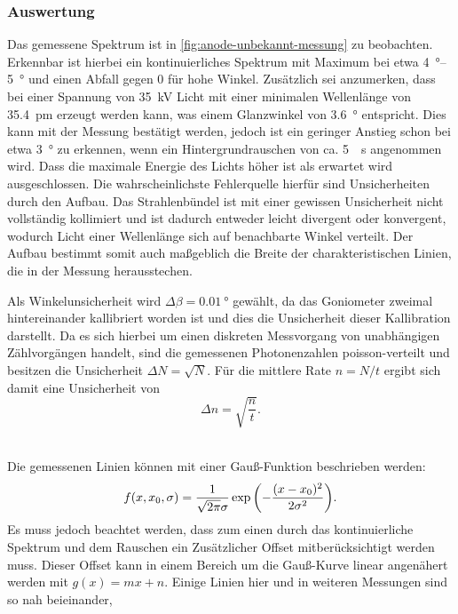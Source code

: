 \subsubsection{Auswertung}
Das gemessene Spektrum ist in \cref{fig:anode-unbekannt-messung} zu beobachten. Erkennbar ist hierbei
ein kontinuierliches Spektrum mit Maximum bei etwa \qtyrange{4}{5}{\degree} und einen Abfall gegen 0
für hohe Winkel. Zusätzlich sei anzumerken, dass bei einer Spannung von \SI{35}{\kilo\volt}
Licht mit einer minimalen Wellenlänge von \SI{35.4}{\pm} erzeugt werden kann, was einem Glanzwinkel
von \SI{3.6}{\degree} entspricht. Dies kann mit der Messung bestätigt werden, jedoch ist ein geringer
Anstieg schon bei etwa \SI{3}{\degree} zu erkennen, wenn ein Hintergrundrauschen von ca. \SI{5}{\per\second}
angenommen wird. Dass die maximale Energie des Lichts höher ist als erwartet wird ausgeschlossen. 
Die wahrscheinlichste Fehlerquelle hierfür sind Unsicherheiten durch den Aufbau. 
Das Strahlenbündel ist mit einer gewissen Unsicherheit nicht vollständig kollimiert und ist 
dadurch entweder leicht divergent oder konvergent, wodurch Licht einer Wellenlänge sich auf benachbarte
Winkel verteilt. Der Aufbau bestimmt somit auch maßgeblich die Breite der charakteristischen Linien, 
die in der Messung herausstechen.\par 
Als Winkelunsicherheit wird $\Delta\beta = \SI{0.01}{\degree}$ gewählt, da das Goniometer zweimal hintereinander 
kallibriert worden ist und dies die Unsicherheit dieser Kallibration darstellt. Da es sich hierbei um 
einen diskreten Messvorgang von unabhängigen Zählvorgängen handelt, sind die gemessenen Photonenzahlen 
poisson-verteilt und besitzen die Unsicherheit $\Delta N = \sqrt{N}$. Für die mittlere Rate $n = N/t$ ergibt sich damit 
eine Unsicherheit von 
\begin{equation}
	\Delta n = \sqrt{\frac{n}{t}}.
	\label{eq:poisson_error}
\end{equation}\\\par
Die gemessenen Linien können mit einer Gauß-Funktion beschrieben werden:
\begin{equation}
	f(x,x_0,\sigma) = \frac{1}{\sqrt{2\pi}\sigma}\exp\qty(-\frac{(x-x_0)^2}{2\sigma^2}).
	\label{eq:gauss}
\end{equation}
Es muss jedoch beachtet werden, dass zum einen durch das kontinuierliche Spektrum und dem Rauschen 
ein Zusätzlicher Offset mitberücksichtigt werden muss. Dieser Offset kann in einem Bereich um 
die Gauß-Kurve linear angenähert werden mit $g(x) = mx + n$. Einige Linien hier und in weiteren Messungen sind so nah beieinander, 
